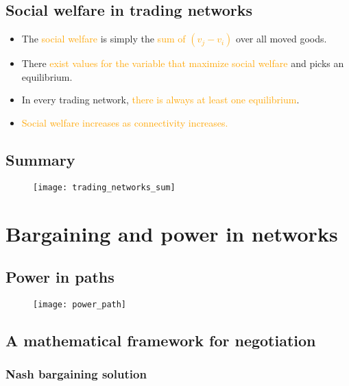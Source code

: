 \subsection{Social welfare in trading networks}

\begin{itemize}
\item The \textcolor{orange}{social welfare} is simply the \textcolor{orange}{sum of $(v_j - v_i)$} over all moved goods.
\item There \textcolor{orange}{exist values for the variable that maximize social welfare} and picks an equilibrium.
\item In every trading network, \textcolor{orange}{there is always at least one equilibrium}.
\item \textcolor{orange}{Social welfare increases as connectivity increases.}
\end{itemize}

\subsection{Summary}

\begin{figure}[H]
    \centering
    \texttt{[image: trading\_networks\_sum]}
\end{figure}

\section{Bargaining and power in networks}

\subsection{Power in paths}

\begin{figure}[H]
    \centering
    \texttt{[image: power\_path]}
\end{figure}

\subsection{A mathematical framework for negotiation}

\subsubsection{Nash bargaining solution}

